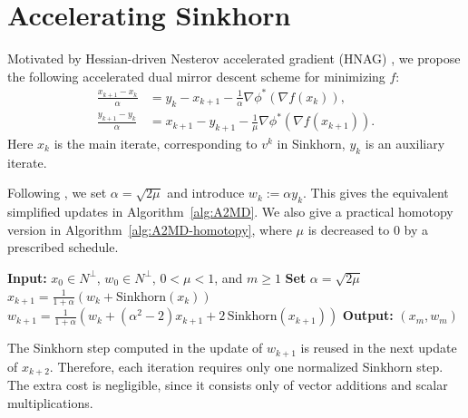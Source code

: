 \documentclass{article}
\theoremstyle{plain}
\theoremstyle{remark}
\begin{document}
\section{Accelerating Sinkhorn}
\label{sec:accelerated}
Motivated by Hessian-driven Nesterov accelerated gradient (HNAG) \citep{chen2019orderoptimizationmethodsbased}, we propose the following accelerated dual mirror descent scheme for minimizing $f$:
\begin{equation}\label{eq:scheme}
\begin{aligned}
\frac{x_{k+1}-x_k}{\alpha} &= y_k-x_{k+1}-\frac{1}{\alpha} \nabla \phi^*(\nabla f(x_k)),\\
\frac{y_{k+1}-y_k}{\alpha} &= x_{k+1}-y_{k+1}-\frac{1}{\mu}\nabla\phi^*(\nabla f(x_{k+1})).
\end{aligned}
\end{equation}
Here $x_k$ is the main iterate, corresponding to $v^k$ in Sinkhorn, $y_k$ is an auxiliary iterate.

Following \citet{chen2025hnagsuperfastacceleratedgradient}, we set $\alpha=\sqrt{2\mu}$ and introduce $w_k:=\alpha y_k$. This gives the equivalent simplified updates in Algorithm~\ref{alg:A2MD}. We also give a practical homotopy version in Algorithm~\ref{alg:A2MD-homotopy}, where $\mu$ is decreased to $0$ by a prescribed schedule.


\begin{algorithm}[htbp]
\caption{Accelerated Dual Mirror Descent for Sinkhorn (Acc-Sinkhorn)}
\label{alg:A2MD}
\begin{algorithmic}[1]
\STATE \textbf{Input:} $x_0\in N^\perp$, $w_0\in N^\perp$, $0<\mu<1$, and $m\geq 1$
\STATE \textbf{Set} $\alpha=\sqrt{2\mu}$
    \STATE $x_{k+1}=\frac{1}{1+\alpha}\left(w_k+\text{Sinkhorn}(x_k)\right)$
    \STATE $w_{k+1}=\frac{1}{1+\alpha}\left(w_k+(\alpha^2-2)x_{k+1}+2\,\text{Sinkhorn}(x_{k+1})\right)$
\ENDFOR
\STATE \textbf{Output:} $(x_m,w_m)$
\end{algorithmic}
\end{algorithm}

The Sinkhorn step computed in the update of $w_{k+1}$ is reused in the next update of $x_{k+2}$. Therefore, each iteration requires only one normalized Sinkhorn step. The extra cost is negligible, since it consists only of vector additions and scalar multiplications.
\end{document}
